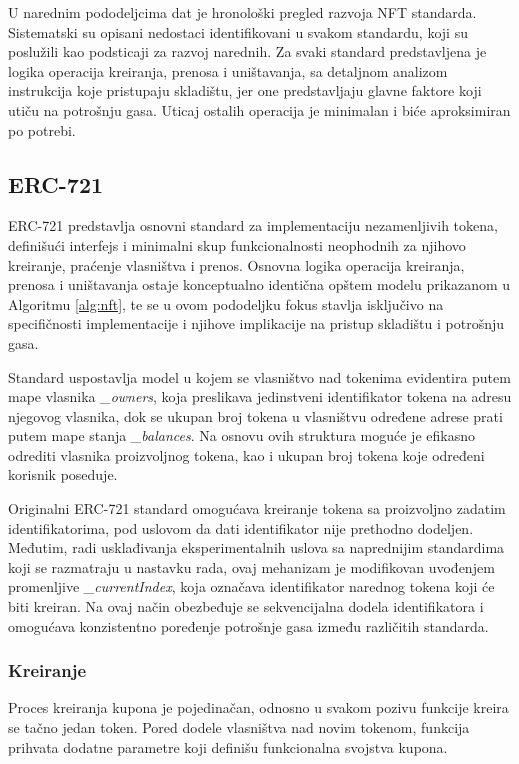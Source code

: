 U narednim pododeljcima dat je hronološki pregled razvoja NFT standarda. Sistematski su opisani nedostaci identifikovani u svakom standardu, koji su poslužili kao podsticaji za razvoj narednih. Za svaki standard predstavljena je logika operacija kreiranja, prenosa i uništavanja, sa detaljnom analizom instrukcija koje pristupaju skladištu, jer one predstavljaju glavne faktore koji utiču na potrošnju gasa. Uticaj ostalih operacija je minimalan i biće aproksimiran po potrebi.

\subsection{ERC-721}
ERC-721 predstavlja osnovni standard za implementaciju nezamenljivih tokena, definišući interfejs i minimalni skup funkcionalnosti neophodnih za njihovo kreiranje, praćenje vlasništva i prenos. Osnovna logika operacija kreiranja, prenosa i uništavanja ostaje konceptualno identična opštem modelu prikazanom u Algoritmu \ref{alg:nft}, te se u ovom pododeljku fokus stavlja isključivo na specifičnosti implementacije i njihove implikacije na pristup skladištu i potrošnju gasa. 

Standard uspostavlja model u kojem se vlasništvo nad tokenima evidentira putem mape vlasnika \textit{\_owners}, koja preslikava jedinstveni identifikator tokena na adresu njegovog vlasnika, dok se ukupan broj tokena u vlasništvu određene adrese prati putem mape stanja \textit{\_balances}. Na osnovu ovih struktura moguće je efikasno odrediti vlasnika proizvoljnog tokena, kao i ukupan broj tokena koje određeni korisnik poseduje.

Originalni ERC-721 standard omogućava kreiranje tokena sa proizvoljno zadatim identifikatorima, pod uslovom da dati identifikator nije prethodno dodeljen. Međutim, radi usklađivanja eksperimentalnih uslova sa naprednijim standardima koji se razmatraju u nastavku rada, ovaj mehanizam je modifikovan uvođenjem promenljive \textit{\_currentIndex}, koja označava identifikator narednog tokena koji će biti kreiran. Na ovaj način obezbeđuje se sekvencijalna dodela identifikatora i omogućava konzistentno poređenje potrošnje gasa između različitih standarda. 

\subsubsection{Kreiranje}
Proces kreiranja kupona je pojedinačan, odnosno u svakom pozivu funkcije kreira se tačno jedan token. Pored dodele vlasništva nad novim tokenom, funkcija prihvata dodatne parametre koji definišu funkcionalna svojstva kupona.


